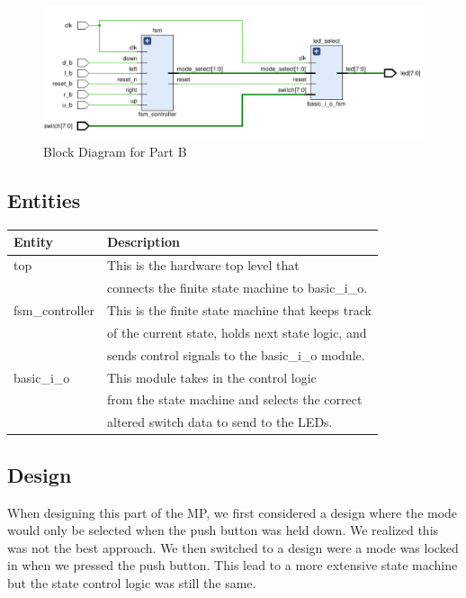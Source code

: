\documentclass[letterpaper, 10 pt, conference]{IEEEconf}  %
\begin{document}
\begin{figure}[thpb]
   \centering
   \parbox{3in}{\centering\includegraphics[scale=0.25]{img/partB.png}}
   \caption{Block Diagram for Part B}
   \label{figurelabel}
\end{figure}

\subsection{Entities}
\begin{table}[H]
\begin{tabular}{|l|l|}
\hline
\rowcolor[HTML]{EFEFEF} 
Entity      & Description                           \\ \hline
top & This is the hardware top level that \\ &connects the finite state machine to basic\_i\_o. \\ \hline
fsm\_controller &  This is the finite state machine that keeps track \\ &of the current state,  holds next state logic,  and \\& sends control signals to the basic\_i\_o module. \\ \hline
basic\_i\_o & This module takes in the control logic \\& from the state machine and selects the correct \\& altered  switch data to send to the LEDs. \\ \hline
\end{tabular}
\end{table}

\subsection{Design}
When designing this part of the MP, we first considered a design where the mode would only be selected when the push button was held down. We realized this was not the best approach. We then switched to a design were a mode was locked in when we pressed the push button. This lead to a more extensive state machine but the state control logic was still the same. 
\end{document}
